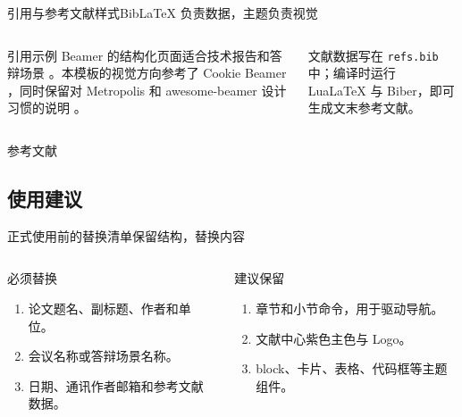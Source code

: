 \documentclass[aspectratio=169]{beamer}
\begin{document}
\begin{frame}{引用与参考文献样式}{BibLaTeX 负责数据，主题负责视觉}
  \begin{columns}[T,onlytextwidth]
      \begin{block}{引用示例}
        Beamer 的结构化页面适合技术报告和答辩场景 \parencite{beameruserguide}。本模板的视觉方向参考了 Cookie Beamer \parencite{cookiebeamer}，同时保留对 Metropolis 和 awesome-beamer 设计习惯的说明 \parencite{metropolis,awesomebeamer}。
      \end{block}

      \begin{cookiecard}[title=参考文献页]
        文献数据写在 \texttt{refs.bib} 中；编译时运行 LuaLaTeX 与 Biber，即可生成文末参考文献。
      \end{cookiecard}
  \end{columns}
\end{frame}

\begin{frame}[allowframebreaks]{参考文献}
  \printbibliography[heading=none]
\end{frame}

\subsection{使用建议}

\begin{frame}{正式使用前的替换清单}{保留结构，替换内容}
  \begin{columns}[T,onlytextwidth]
      \begin{block}{必须替换}
        \begin{enumerate}
          \item 论文题名、副标题、作者和单位。
          \item 会议名称或答辩场景名称。
          \item 日期、通讯作者邮箱和参考文献数据。
        \end{enumerate}
      \end{block}

      \begin{exampleblock}{建议保留}
        \begin{enumerate}
          \item 章节和小节命令，用于驱动导航。
          \item 文献中心紫色主色与 Logo。
          \item block、卡片、表格、代码框等主题组件。
        \end{enumerate}
      \end{exampleblock}
  \end{columns}
\end{frame}
\end{document}
